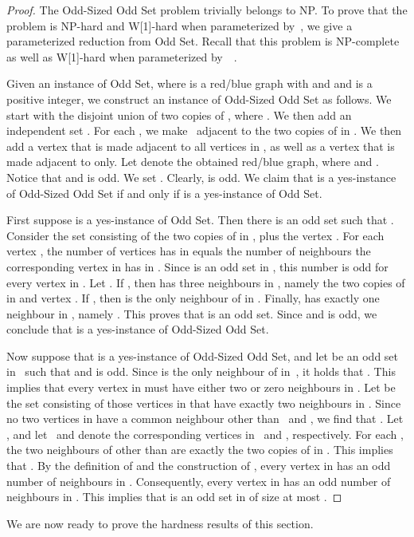 \documentclass[11pt]{llncs}
\newcommand{\NP}{{\sf NP}}
\newcommand{\W}{{\sf W[1]}}
\begin{document}
\begin{proof}
The {\sc Odd-Sized Odd Set} problem trivially belongs to \NP. To prove
that the problem is \NP-hard and \W-hard when parameterized
by~, we give a parameterized reduction from {\sc Odd Set}. 
Recall that this problem is \NP-complete as well as \W-hard when
parameterized by~~\cite{DowneyFVW99}.

Given an instance  of {\sc Odd Set}, where  is
a red/blue graph with  and  and  is 
a positive integer, we construct an instance  of {\sc Odd-Sized Odd
Set} as follows. We start with the disjoint union  of two copies
of , where . We then add an independent set
. For each , we make~
adjacent to the two copies of  in . We then add
a vertex  that is made adjacent to all vertices in , as well as
a vertex  that is made adjacent to  only. Let  denote the obtained red/blue graph, where  and . 
Notice that  and  is odd.  We set
. 
Clearly,   is odd.  We claim that  is a yes-instance of {\sc
Odd-Sized Odd Set} if and only if  is a yes-instance of {\sc Odd Set}.

First suppose  is a yes-instance of {\sc Odd Set}. Then there is an odd
set  such that . Consider the set  consisting of the two copies of  in , plus the vertex . For
each vertex , the number of vertices  has in
 equals the number of neighbours the corresponding vertex in  has
in . Since  is an odd set in , this number is odd for every vertex in
. Let . If , then 
has three neighbours in , namely the two copies of  in  and vertex . If , then  is the only
neighbour of  in . Finally,  has exactly one neighbour in ,
namely . This proves that  is an odd set. Since  and  is odd, we conclude that  is a yes-instance of
{\sc Odd-Sized Odd Set}. 

Now suppose that  is a yes-instance of {\sc Odd-Sized Odd Set}, and
let  be an odd set in~ such that  and
 is odd. Since  is the only neighbour of  in~, it holds
that . This implies that every vertex in  must have either
two or zero neighbours in . Let  be the set
consisting of those vertices in  that have exactly two neighbours in
. Since no two vertices in  have a common
neighbour other than~ and , we find that . Let , and let~
and  denote the corresponding vertices in~ and ,
respectively. For each , the two neighbours of  other
than  are exactly the two copies of  in . This implies that
. By the definition of  and the
construction of , every vertex in  has an odd number of
neighbours in . Consequently, every vertex in  has an odd
number of neighbours in . This implies that  is an odd set in  of size
at most .
\end{proof}
We are now ready to prove the hardness results of this section.
\end{document}
